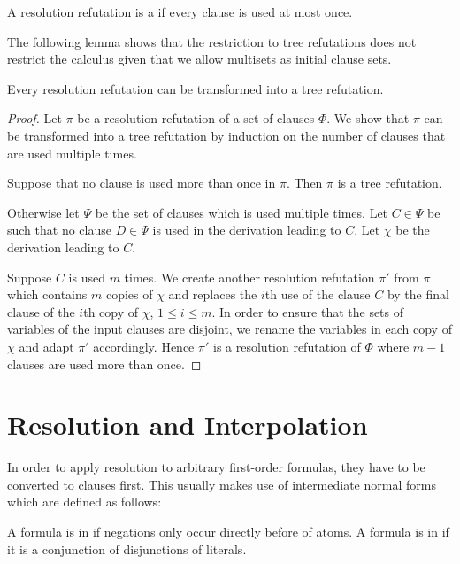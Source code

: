 \begin{defi}
	A resolution refutation is a  if every clause is used at most once.
\end{defi}

The following lemma shows that the restriction to tree refutations does not restrict the calculus given that we allow multisets as initial clause sets.
\begin{lemma}
  \label{lemma:bin_tree_deduction}
  Every resolution refutation can be transformed into a tree refutation.
\end{lemma}
\begin{proof}
  Let $\pi$ be a resolution refutation of a set of clauses $\Phi$.
  We show that $\pi$ can be transformed into a tree refutation by induction on the number of clauses that are used multiple times.

  Suppose that no clause is used more than once in $\pi$. Then $\pi$ is a tree refutation.

  Otherwise let $\Psi$ be the set of clauses which is used multiple times.
  Let $C \in \Psi$ be such that no clause $D \in \Psi$ is used in the derivation leading to $C$.
  Let $\chi$ be the derivation leading to $C$.

  Suppose $C$ is used $m$ times.
  We create another resolution refutation $\pi'$ from $\pi$ which contains $m$ copies of $\chi$ and replaces the $i$th use of the clause $C$ by the final clause of the $i$th copy of $\chi$, $1 \leq i \leq m$.
  In order to ensure that the sets of variables of the input clauses are disjoint, we rename the variables in each copy of $\chi$ and adapt $\pi'$ accordingly.
  Hence $\pi'$ is a resolution refutation of $\Phi$ where $m-1$ clauses are used more than once.
\end{proof}


\section{Resolution and Interpolation}


In order to apply resolution to arbitrary first-order formulas, they have to be converted to clauses first.
This usually makes use of intermediate normal forms which are defined as follows:

\begin{defi}
	A formula is in  if negations only occur directly before of atoms.
	A formula is in  if it is a conjunction of disjunctions of literals.
\end{defi}

